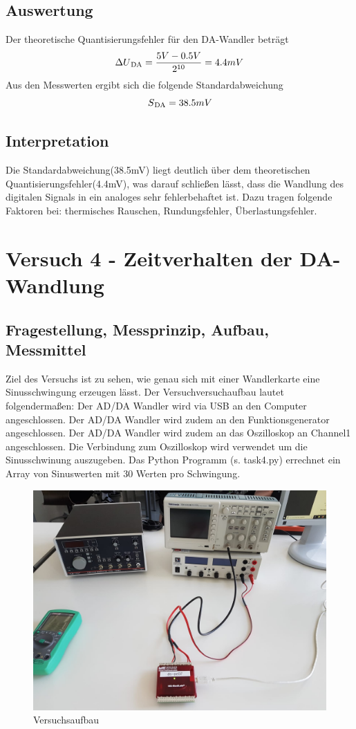 \documentclass[12pt, oneside, a4paper, \docLanguage]{report}
\begin{document}
\section{Auswertung}
\label{chap:VERSUCH_3_AUSWERTUNG}
Der theoretische Quantisierungsfehler für den DA-Wandler beträgt
\begin{equation}
\Delta U\textsubscript{DA} = \frac{5V - 0.5V}{2 \textsuperscript{10}} = 4.4mV
\end{equation}
Aus den Messwerten ergibt sich die folgende Standardabweichung
\begin{equation}
S\textsubscript{DA} = 38.5mV
\end{equation}

\section{Interpretation}
\label{chap:VERSUCH_3_INTERPRETATION}
Die Standardabweichung(38.5mV) liegt deutlich über dem theoretischen Quantisierungsfehler(4.4mV), was darauf schließen lässt, dass die Wandlung des digitalen Signals in ein analoges sehr fehlerbehaftet ist. Dazu tragen folgende Faktoren bei: thermisches Rauschen, Rundungsfehler, Überlastungsfehler.
%
%
\chapter{Versuch 4 - Zeitverhalten der DA-Wandlung}
\label{chap:VERSUCH_4}

\section{Fragestellung, Messprinzip, Aufbau, Messmittel}
\label{chap:VERSUCH_4_FRAGESTELLUNG}
Ziel des Versuchs ist zu sehen, wie genau sich mit einer Wandlerkarte eine Sinusschwingung erzeugen lässt.
Der Versuchversuchaufbau lautet folgendermaßen:
\newline
Der AD/DA Wandler wird via USB an den Computer angeschlossen.
Der AD/DA Wandler wird zudem an den Funktionsgenerator angeschlossen.
\newline
Der AD/DA Wandler wird zudem an das Oszilloskop an Channel1 angeschlossen.
\newline
Die Verbindung zum Oszilloskop wird verwendet um die Sinusschwinung auszugeben.
\newline
Das Python Programm (s. task4.py) errechnet ein Array von Sinuswerten mit 30 Werten pro Schwingung.
\begin{figure}[H]
	\centering\small
	\graphicspath{ {../versuch4/} }
	\includegraphics[width=.5\textwidth]{media/versuch3}
	\caption{Versuchsaufbau}
	\label{fig:TEIL1KOMPLETT}
\end{figure}
\newpage
\end{document}
